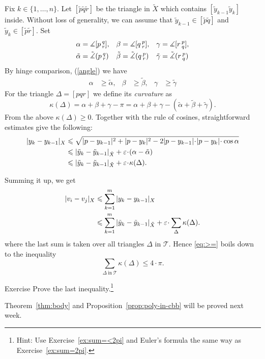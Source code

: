 Fix $k\in\{1,\dots,n\}$.
Let $[\tilde p\tilde q\tilde r]$ be the triangle in $\tilde X$ which contains $[\tilde y_{k-1}\tilde y_k]$ inside.
Without loss of generality,
we can assume that $\tilde y_{k-1}\in[\tilde p\tilde q]$ and $\tilde y_k\in[\tilde p\tilde r]$.
Set
\begin{align*}
\alpha&=\measuredangle[p\,{}^{q}_{r}], 
&
\beta&=\measuredangle[q\,{}^{p}_{r}], 
&
\gamma&=\measuredangle[r\,{}^{p}_{q}],
\\ 
\tilde\alpha&=\tilde\measuredangle(p\,{}^{q}_{r})
&
\tilde\beta&=\tilde\measuredangle(q\,{}^{p}_{r})
&
\tilde\gamma&=\tilde\measuredangle(r\,{}^{p}_{q})
\end{align*}
By hinge comparison, (\ref{angle}) 
we have
\begin{align*}
\alpha&\ge \tilde\alpha, 
&
\beta&\ge\tilde\beta, 
&
\gamma&\ge\tilde\gamma
\end{align*}
For the triangle $\Delta=[pqr]$
we define its \emph{curvature} as  
$$\kappa(\Delta)=\alpha+\beta+\gamma-\pi=\alpha+\beta+\gamma-(\tilde\alpha+\tilde\beta+\tilde\gamma).$$
From the above $\kappa(\Delta)\ge 0$.
Together with the rule of cosines, straightforward estimates give the following: 
\begin{align*}
|y_{k}-y_{k-1}|_{X}
&\le \sqrt{|p-y_{k-1}|^2+|p-y_{k}|^2-2|p-y_{k-1}|\cdot|p-y_{k}|\cdot\cos\alpha}
\\
&\le |\tilde y_{k}-\tilde y_{k-1}|_{\tilde X}+\eps\cdot(\alpha-\tilde\alpha)
\\
&\le|\tilde y_{k}-\tilde y_{k-1}|_{\tilde X}+\eps\cdot\kappa(\Delta).
\end{align*}

Summing it up, we get
\begin{align*}
|v_i-v_j|_{X}
&\le \sum_{k=1}^m|y_{k}-y_{k-1}|_{X}
\\
&\le \sum_{k=1}^m|\tilde y_{k}-\tilde y_{k-1}|_{\tilde X}+\eps\cdot\sum_{\Delta}\kappa(\Delta).
\end{align*}
where the last sum is taken over all triangles $\Delta$ in $\mathcal T$.
Hence \ref{eq:>=} boils down to the inequality
$$\sum_{\Delta\ \text{in}\ \mathcal T}\kappa(\Delta)\le 4\cdot\pi.$$

\begin{thm}{Exercise}
Prove the last inequality.\footnote{Hint: Use   Exercise~\ref{ex:sum=<2pi}
 and Euler's formula 
the same way as Exercise~\ref{ex:sum=2pi}.}
\end{thm}
\qedsf

Theorem~\ref{thm:body} and Proposition~\ref{prop:poly-in-cbb} will be proved next week.






